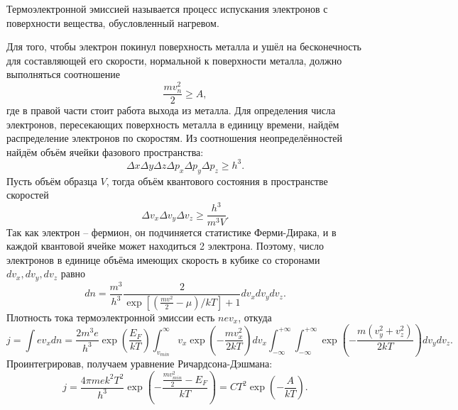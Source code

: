 Термоэлектронной эмиссией называется процесс испускания электронов с поверхности
вещества, обусловленный нагревом.

Для того, чтобы электрон покинул поверхность металла и ушёл на бесконечность для
составляющей его скорости, нормальной к поверхности металла, должно выполняться
соотношение
\[
    \frac{mv_n^2}{2} \ge A,
\]
где в правой части стоит работа выхода из металла.
Для определения числа электронов, пересекающих поверхность металла в единицу
времени, найдём распределение электронов по скоростям.
Из соотношения неопределённостей найдём объём ячейки фазового пространства:
\[
    \Delta x \Delta y \Delta z \Delta p_x \Delta p_y \Delta p_z \ge h^3.
\]
Пусть объём образца \( V \), тогда объём квантового состояния в пространстве
скоростей
\[
     \Delta v_x \Delta v_y \Delta v_z \ge \frac{h^3}{m^3V}.
\]
Так как электрон -- фермион, он подчиняется статистике Ферми-Дирака, и в каждой
квантовой ячейке может находиться 2 электрона. Поэтому, число электронов в
единице объёма имеющих скорость в кубике со сторонами \( dv_x, dv_y, dv_z \)
равно
\[
    dn = \frac{m^3}{h^3}\frac{2}{\exp\left[\left(\frac{mv^2}{2} -
    \mu\right)/kT\right]+1} dv_xdv_ydv_z.
\]
Плотность тока термоэлектронной эмиссии есть \( nev_x \), откуда
\[
    j = \int ev_x dn = \frac{2m^3e}{h^3}\exp\left(\frac{E_F}{kT} \right)
    \int_{v_{min}}^\infty v_x\exp\left(-\frac{mv_x^2}{2kT}\right)dv_x
    \int_{-\infty}^{+\infty}\int_{-\infty}^{+\infty}
    \exp\left(-\frac{m(v_y^2+v_z^2)}{2kT}\right)dv_ydv_z.
\]
Проинтегрировав, получаем уравнение Ричардсона-Дэшмана:
\[
    j = \frac{4\pi me k^2T^2}{h^3}
    \exp\left(-\frac{\frac{mv_{min}^2}{2} - E_F}{kT}\right) =
    CT^2\exp\left(-\frac{A}{kT} \right).
\]


